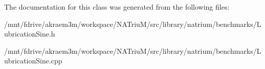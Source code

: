 The documentation for this class was generated from the following files:\begin{DoxyCompactItemize}
\item 
/mnt/fdrive/akraem3m/workspace/NATriuM/src/library/natrium/benchmarks/LubricationSine.h\item 
/mnt/fdrive/akraem3m/workspace/NATriuM/src/library/natrium/benchmarks/LubricationSine.cpp\end{DoxyCompactItemize}
